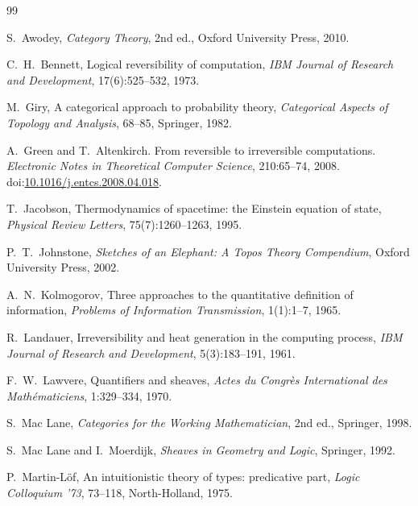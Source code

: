 \documentclass[12pt,a4paper]{article}
\theoremstyle{definition}
\theoremstyle{remark}
\begin{document}
\begin{thebibliography}{99}

S.~Awodey, \emph{Category Theory}, 2nd ed., Oxford University Press, 2010.

C.~H.~Bennett, Logical reversibility of computation,
\emph{IBM Journal of Research and Development}, 17(6):525--532, 1973.

M.~Giry, A categorical approach to probability theory,
\emph{Categorical Aspects of Topology and Analysis}, 68--85, Springer, 1982.

A.~Green and T.~Altenkirch.
\newblock From reversible to irreversible computations.
\newblock \emph{Electronic Notes in Theoretical Computer Science},
210:65--74, 2008.
\newblock doi:\href{https://doi.org/10.1016/j.entcs.2008.04.018}{10.1016/j.entcs.2008.04.018}.

T.~Jacobson, Thermodynamics of spacetime: the Einstein equation of state,
\emph{Physical Review Letters}, 75(7):1260--1263, 1995.

P.~T.~Johnstone, \emph{Sketches of an Elephant: A Topos Theory Compendium},
Oxford University Press, 2002.

A.~N.~Kolmogorov, Three approaches to the quantitative definition of information,
\emph{Problems of Information Transmission}, 1(1):1--7, 1965.

R.~Landauer, Irreversibility and heat generation in the computing process,
\emph{IBM Journal of Research and Development}, 5(3):183--191, 1961.

F.~W.~Lawvere, Quantifiers and sheaves,
\emph{Actes du Congrès International des Mathématiciens}, 1:329--334, 1970.

S.~Mac Lane, \emph{Categories for the Working Mathematician}, 2nd ed., Springer, 1998.

S.~Mac Lane and I.~Moerdijk, \emph{Sheaves in Geometry and Logic}, Springer, 1992.

P.~Martin-L\"of, An intuitionistic theory of types: predicative part,
\emph{Logic Colloquium '73}, 73--118, North-Holland, 1975.


\end{thebibliography}
\end{document}
